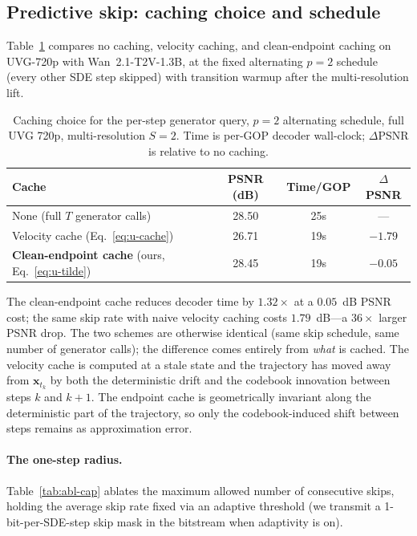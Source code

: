\subsection{Predictive skip: caching choice and schedule}
\label{sec:abl-skip}

Table~\ref{tab:abl-skip} compares no caching, velocity caching, and
clean-endpoint caching on UVG-720p with Wan~2.1-T2V-1.3B, at the fixed
alternating $p\!=\!2$ schedule (every other SDE step skipped) with
transition warmup after the multi-resolution lift.

\begin{table}[t]
\centering
\caption{Caching choice for the per-step generator query, $p\!=\!2$
alternating schedule, full UVG 720p, multi-resolution
$S\!=\!2$. Time is per-GOP decoder wall-clock; $\Delta$PSNR is relative
to no caching.}
\label{tab:abl-skip}
\small
\begin{tabular}{@{}l c c c@{}}
\toprule
Cache & PSNR (dB) & Time/GOP & $\Delta$PSNR \\
\midrule
None (full $T$ generator calls)    & 28.50 & 25s & --- \\
Velocity cache (Eq.~\ref{eq:u-cache})       & 26.71 & 19s & $-1.79$ \\
\rowcolor{wacvblue!10}
\textbf{Clean-endpoint cache} (ours, Eq.~\ref{eq:u-tilde}) & 28.45 & 19s & $-0.05$ \\
\bottomrule
\end{tabular}
\end{table}

The clean-endpoint cache reduces decoder time by $1.32\times$ at a
$0.05$~dB PSNR cost; the same skip rate with naive velocity caching costs
$1.79$~dB---a $36\times$ larger PSNR drop. The two schemes are otherwise
identical (same skip schedule, same number of generator calls); the
difference comes entirely from \emph{what} is cached. The velocity cache
is computed at a stale state and the trajectory has moved away from
$\mathbf{x}_{t_k}$ by both the deterministic drift and the codebook
innovation between steps $k$ and $k\!+\!1$. The endpoint cache is
geometrically invariant along the deterministic part of the trajectory,
so only the codebook-induced shift between steps remains as approximation
error.

\paragraph{The one-step radius.}
Table~\ref{tab:abl-cap} ablates the maximum allowed number of
consecutive skips, holding the average skip rate fixed via an adaptive
threshold (we transmit a 1-bit-per-SDE-step skip mask in the bitstream
when adaptivity is on).

